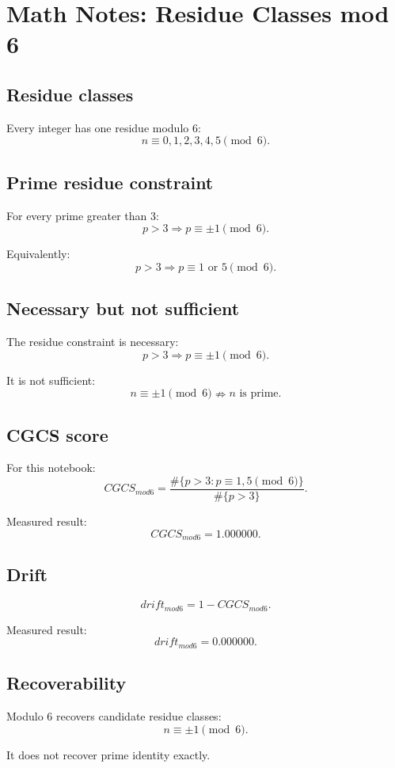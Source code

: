\documentclass{article}
\begin{document}
\section*{Math Notes: Residue Classes mod 6}

\subsection*{Residue classes}

Every integer has one residue modulo 6:
\[
n \equiv 0,1,2,3,4,5 \pmod{6}.
\]

\subsection*{Prime residue constraint}

For every prime greater than 3:
\[
p > 3 \Rightarrow p \equiv \pm 1 \pmod{6}.
\]

Equivalently:
\[
p > 3 \Rightarrow p \equiv 1 \text{ or } 5 \pmod{6}.
\]

\subsection*{Necessary but not sufficient}

The residue constraint is necessary:
\[
p>3 \Rightarrow p \equiv \pm 1 \pmod{6}.
\]

It is not sufficient:
\[
n \equiv \pm 1 \pmod{6} \nRightarrow n \text{ is prime}.
\]

\subsection*{CGCS score}

For this notebook:
\[
CGCS_{mod6} =
\frac{\#\{p>3 : p \equiv 1,5 \pmod{6}\}}
{\#\{p>3\}}.
\]

Measured result:
\[
CGCS_{mod6} = 1.000000.
\]

\subsection*{Drift}

\[
drift_{mod6} = 1 - CGCS_{mod6}.
\]

Measured result:
\[
drift_{mod6} = 0.000000.
\]

\subsection*{Recoverability}

Modulo 6 recovers candidate residue classes:
\[
n \equiv \pm 1 \pmod{6}.
\]

It does not recover prime identity exactly.
\end{document}
